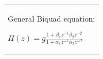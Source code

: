 \begin{tabular}{@{}L@{}}
General Biquad equation:

$H(z) = 
g\frac{
1 + \beta_1 z^{-1} \beta_2 z^{-2}
} {
1 + \alpha_1 z^{-1} \alpha_2 z^{-2}
}
$
\end{tabular}
